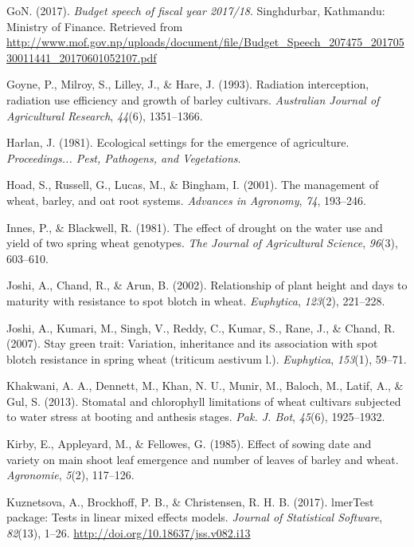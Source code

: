 \documentclass[12pt,oneside]{dukestatscithesis} %
\theoremstyle{definition}
\theoremstyle{definition}
\theoremstyle{definition}
\theoremstyle{remark}
\begin{document}
\hypertarget{ref-fiscal_budget201718}{}
GoN. (2017). \emph{Budget speech of fiscal year 2017/18}. Singhdurbar,
Kathmandu: Ministry of Finance. Retrieved from
\url{http://www.mof.gov.np/uploads/document/file/Budget_Speech_207475_20170530011441_20170601052107.pdf}

\hypertarget{ref-goyne1993radiation}{}
Goyne, P., Milroy, S., Lilley, J., \& Hare, J. (1993). Radiation
interception, radiation use efficiency and growth of barley cultivars.
\emph{Australian Journal of Agricultural Research}, \emph{44}(6),
1351--1366.

\hypertarget{ref-harlan1981ecological}{}
Harlan, J. (1981). Ecological settings for the emergence of agriculture.
\emph{Proceedings... Pest, Pathogens, and Vegetations}.

\hypertarget{ref-hoad2001management}{}
Hoad, S., Russell, G., Lucas, M., \& Bingham, I. (2001). The management
of wheat, barley, and oat root systems. \emph{Advances in Agronomy},
\emph{74}, 193--246.

\hypertarget{ref-innes1981effect}{}
Innes, P., \& Blackwell, R. (1981). The effect of drought on the water
use and yield of two spring wheat genotypes. \emph{The Journal of
Agricultural Science}, \emph{96}(3), 603--610.

\hypertarget{ref-joshi2002relationship}{}
Joshi, A., Chand, R., \& Arun, B. (2002). Relationship of plant height
and days to maturity with resistance to spot blotch in wheat.
\emph{Euphytica}, \emph{123}(2), 221--228.

\hypertarget{ref-joshi2007stay}{}
Joshi, A., Kumari, M., Singh, V., Reddy, C., Kumar, S., Rane, J., \&
Chand, R. (2007). Stay green trait: Variation, inheritance and its
association with spot blotch resistance in spring wheat (triticum
aestivum l.). \emph{Euphytica}, \emph{153}(1), 59--71.

\hypertarget{ref-khakwani2013stomatal}{}
Khakwani, A. A., Dennett, M., Khan, N. U., Munir, M., Baloch, M., Latif,
A., \& Gul, S. (2013). Stomatal and chlorophyll limitations of wheat
cultivars subjected to water stress at booting and anthesis stages.
\emph{Pak. J. Bot}, \emph{45}(6), 1925--1932.

\hypertarget{ref-kirby1985effect}{}
Kirby, E., Appleyard, M., \& Fellowes, G. (1985). Effect of sowing date
and variety on main shoot leaf emergence and number of leaves of barley
and wheat. \emph{Agronomie}, \emph{5}(2), 117--126.

\hypertarget{ref-alexandra2017}{}
Kuznetsova, A., Brockhoff, P. B., \& Christensen, R. H. B. (2017).
lmerTest package: Tests in linear mixed effects models. \emph{Journal of
Statistical Software}, \emph{82}(13), 1--26.
\url{http://doi.org/10.18637/jss.v082.i13}
\end{document}
